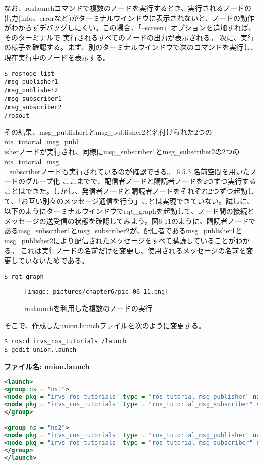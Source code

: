 なお、roslaunchコマンドで複数のノードを実行するとき、実行されるノードの出力(info、errorなど)がターミナルウインドウに表示されないと、ノードの動作がわからずデバッグしにくい。この場合、「--screen」オプションを追加すれば、そのターミナルで  実行されるすべてのノードの出力が表示される。
次に、実行の様子を確認する。まず、別のターミナルウインドウで次のコマンドを実行し、現在実行中のノードを表示する。

\begin{lstlisting}[language=ROS]
$ rosnode list
/msg_publisher1
/msg_publisher2
/msg_subscriber1
/msg_subscriber2
/rosout
\end{lstlisting}

その結果、msg\_publisher1とmsg\_publisher2と名付けられた2つのros\_tutorial\_msg\_publ\\isherノードが実行され、同様にmsg\_subscriber1とmsg\_subscriber2の2つのros\_tutorial\_msg\\\_subscriberノードも実行されているのが確認できる。
6.5.3 名前空間を用いたノードのグループ化
ここまでで、配信者ノードと購読者ノードを2つずつ実行することはできた。しかし、発信者ノードと購読者ノードをそれぞれ2つずつ起動して、「お互い別々のメッセージ通信を行う」ことは実現できていない。試しに、以下のようにターミナルウインドウでrqt\_graphを起動して、ノード間の接続とメッセージの送受信の状態を確認してみよう。図6-11のように、購読者ノードであるmsg\_subscriber1とmsg\_subscriber2が、配信者であるmsg\_publisher1とmsg\_publisher2により配信されたメッセージをすべて購読していることがわかる。 これは実行ノードの名前だけを変更し、使用されるメッセージの名前を変更していないためである。

\begin{lstlisting}[language=ROS]
$ rqt_graph
\end{lstlisting}

\begin{figure}[h]
  \centering
  \texttt{[image: pictures/chapter6/pic\_06\_11.png]}
  \caption{roslaunchを利用した複数のノードの実行}
\end{figure}

そこで、作成したunion.launchファイルを次のように変更する。

\begin{lstlisting}[language=ROS]
$ roscd irvs_ros_tutorials /launch
$ gedit union.launch
\end{lstlisting}

\noindent\textbf{ファイル名: union.launch}
\begin{lstlisting}[language=XML]
<launch>
<group ns = "ns1">
<node pkg = "irvs_ros_tutorials" type = "ros_tutorial_msg_publisher" name = "msg_publisher" />
<node pkg = "irvs_ros_tutorials" type = "ros_tutorial_msg_subscriber" name = "msg_subscriber" />
</group>

<group ns = "ns2">
<node pkg = "irvs_ros_tutorials" type = "ros_tutorial_msg_publisher" name = "msg_publisher" />
<node pkg = "irvs_ros_tutorials" type = "ros_tutorial_msg_subscriber" name = "msg_subscriber" />
</group>
</launch>
\end{lstlisting}

